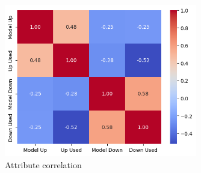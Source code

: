 \begin{figure}[H]
    \centering
    \includegraphics[width=0.75\textwidth]{plots/heatmap_correlation_pred.png}
    \caption{Attribute correlation}
    \label{fig:Attribute_correlation}
  \end{figure}


 \par





